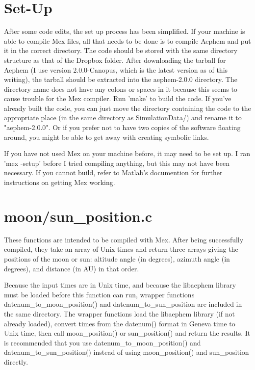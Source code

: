 \documentclass[12pt]{report}
\begin{document}
\section{Set-Up}
After some code edits, the set up process has been simplified.  If your machine is able to compile Mex files, all that needs to be done is to compile Aephem and put it in the correct directory.  The code should be stored with the same directory structure as that of the Dropbox folder.  After downloading the tarball for Aephem (I use version 2.0.0-Canopus, which is the latest version as of this writing), the tarball should be extracted into the aephem-2.0.0 directory.  The directory name does not have any colons or spaces in it because this seems to cause trouble for the Mex compiler.  Run 'make' to build the code.  If you've already built the code, you can just move the directory containing the code to the appropriate place (in the same directory as SimulationData/) and rename it to "aephem-2.0.0".  Or if you prefer not to have two copies of the software floating around, you might be able to get away with creating symbolic links.

If you have not used Mex on your machine before, it may need to be set up.  I ran 'mex -setup' before I tried compiling anything, but this may not have been necessary.  If you cannot build, refer to Matlab's documention for further instructions on getting Mex working.

\section{moon/sun\_position.c}
These functions are intended to be compiled with Mex.  After being successfully compiled, they take an array of Unix times and return three arrays giving the positions of the moon or sun: altitude angle (in degrees), azimuth angle (in degrees), and distance (in AU) in that order.

Because the input times are in Unix time, and because the libaephem library must be loaded before this function can run, wrapper functions datenum\_to\_moon\_position() and datenum\_to\_sun\_position are included in the same directory.  The wrapper functions load the libaephem library (if not already loaded), convert times from the datenum() format in Geneva time to Unix time, then call moon\_position() or sun\_position() and return the results.  It is recommended that you use datenum\_to\_moon\_position() and datenum\_to\_sun\_position() instead of using moon\_position() and sun\_position directly.
\end{document}
